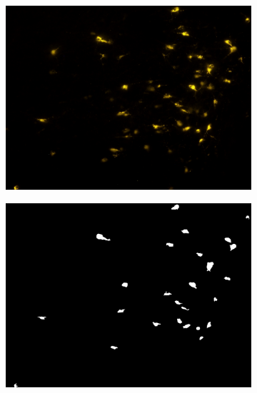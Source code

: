 \begin{figure}
\begin{subfigure}{0.5\textwidth}
\includegraphics[width=\linewidth]{figures/120_dataset/i_168.jpeg}
\label{fig:dataset:dark}
\end{subfigure}
\begin{subfigure}{0.5\textwidth}
\includegraphics[width=\linewidth]{figures/120_dataset/m_168.png}
\label{fig:dataset:dark_mask}
\end{subfigure}


\end{figure}
